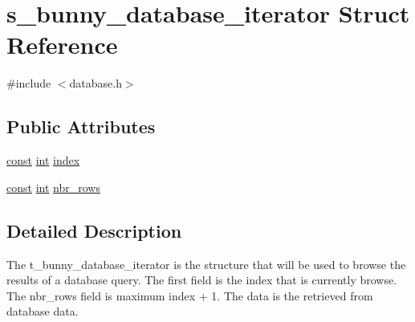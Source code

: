 \hypertarget{structs__bunny__database__iterator}{\section{s\-\_\-bunny\-\_\-database\-\_\-iterator Struct Reference}
\label{structs__bunny__database__iterator}
}


{\ttfamily \#include $<$database.\-h$>$}

\subsection*{Public Attributes}
\begin{DoxyCompactItemize}
\item 
\hyperlink{term__entry_8h_a57bd63ce7f9a353488880e3de6692d5a}{const} \hyperlink{term__entry_8h_ad65b480f8c8270356b45a9890f6499ae}{int} \hyperlink{structs__bunny__database__iterator_a2765db1909f0fbeb97883fe0c25bacf3}{index}
\item 
\hyperlink{term__entry_8h_a57bd63ce7f9a353488880e3de6692d5a}{const} \hyperlink{term__entry_8h_ad65b480f8c8270356b45a9890f6499ae}{int} \hyperlink{structs__bunny__database__iterator_adc0be4358231e7de8744ba59ee171de3}{nbr\-\_\-rows}
\end{DoxyCompactItemize}


\subsection{Detailed Description}
The t\-\_\-bunny\-\_\-database\-\_\-iterator is the structure that will be used to browse the results of a database query. The first field is the index that is currently browse. The nbr\-\_\-rows field is maximum index + 1. The data is the retrieved from database data. 


